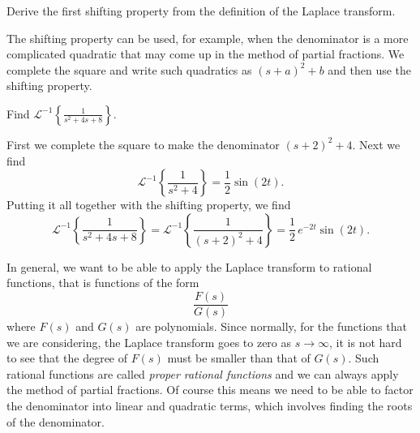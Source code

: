 \documentclass{ximera}
\begin{document}
\begin{exercise}
    Derive the first shifting property from the definition of the Laplace transform.
\end{exercise}

The shifting property can be used, for example, when the denominator is a more complicated quadratic that may come up in the method of partial fractions.  We complete the square and write such quadratics as ${(s+a)}^2+b$ and then use the shifting property.

\begin{example}
    Find ${\mathcal{L}}^{-1} \left\{ \frac{1}{s^2+4s+8} \right\}$.
\end{example}

\begin{exampleSol}
    First we complete the square to make the denominator ${(s+2)}^2+4$. Next we find
    \begin{equation*}
        {\mathcal{L}}^{-1} \left\{ \frac{1}{s^2+4} \right\} = \frac{1}{2} \sin (2t) .
    \end{equation*}
    Putting it all together with the shifting property, we find
    \begin{equation*}
        {\mathcal{L}}^{-1} \left\{ \frac{1}{s^2+4s+8} \right\} = {\mathcal{L}}^{-1} \left\{ \frac{1}{{(s+2)}^2+4} \right\} = \frac{1}{2}\,e^{-2t} \sin (2t) .
    \end{equation*}
\end{exampleSol}

In general, we want to be able to apply the Laplace transform to rational functions, that is functions of the form
\begin{equation*}
    \frac{F(s)}{G(s)}
\end{equation*}
where $F(s)$ and $G(s)$ are polynomials.  Since normally, for the functions that we are considering, the Laplace transform goes to zero as $s \to \infty$, it is not hard to see that the degree of $F(s)$ must be smaller than that of $G(s)$.  Such rational functions are called \emph{proper rational functions} and we can always apply the method of partial fractions.  Of course this means we need to be able to factor the denominator into linear and quadratic terms, which involves finding the roots of the denominator.
\end{document}
